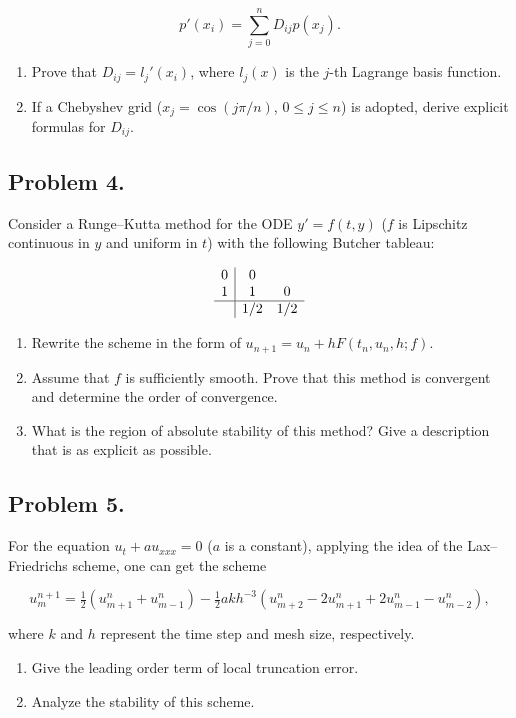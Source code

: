 \documentclass[11pt,a4paper]{article}
\begin{document}
\[
p'(x_{i}) = \sum_{j=0}^{n} D_{ij} p(x_{j}).
\]

\begin{enumerate}[label=(\arabic*)]
    \item Prove that \(D_{ij} = l_{j}'(x_{i})\), where \(l_{j}(x)\) is the \(j\)-th Lagrange basis function.
    \item If a Chebyshev grid (\(x_{j} = \cos(j\pi/n)\), \(0 \le j \le n\)) is adopted, derive explicit formulas for \(D_{ij}\).
\end{enumerate}

\subsection{Problem 4.}
Consider a Runge--Kutta method for the ODE \(y' = f(t, y)\) (\(f\) is Lipschitz continuous in \(y\) and uniform in \(t\)) with the following Butcher tableau:

\[
\begin{array}{c|cc}
0 & 0 \\
1 & 1 & 0 \\
\hline
& 1/2 & 1/2
\end{array}
\]

\begin{enumerate}[label=(\arabic*)]
    \item Rewrite the scheme in the form of \(u_{n+1} = u_{n} + h F(t_{n}, u_{n}, h; f)\).
    \item Assume that \(f\) is sufficiently smooth. Prove that this method is convergent and determine the order of convergence.
    \item What is the region of absolute stability of this method? Give a description that is as explicit as possible.
\end{enumerate}

\subsection{Problem 5.}
For the equation \(u_{t} + a u_{xxx} = 0\) (\(a\) is a constant), applying the idea of the Lax--Friedrichs scheme, one can get the scheme

\[
u_{m}^{n+1} = \tfrac12 (u_{m+1}^{n} + u_{m-1}^{n}) - \tfrac12 a k h^{-3} (u_{m+2}^{n} - 2u_{m+1}^{n} + 2u_{m-1}^{n} - u_{m-2}^{n}),
\]

where \(k\) and \(h\) represent the time step and mesh size, respectively.
\begin{enumerate}[label=(\arabic*)]
    \item Give the leading order term of local truncation error.
    \item Analyze the stability of this scheme.
\end{enumerate}
\end{document}
